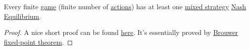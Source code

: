 \begin{theorem}\label{thm:Nash-existence-theorem}
	Every finite \hyperref[def:mathematical-game]{game} (finite number of \hyperref[def:strategy]{actions}) has at least one \hyperref[def:mixed-strategy]{mixed strategy} \hyperref[def:Nash-equilibrium]{Nash Equilibrium}.
\end{theorem}
\begin{proof}
	A nice short proof can be found \href{https://www.cs.ubc.ca/~kevinlb/papers/TR-2007-25.pdf}{here}. It's essentially proved by \href{https://en.wikipedia.org/wiki/Brouwer_fixed-point_theorem}{Brouwer fixed-point theorem}.
\end{proof}